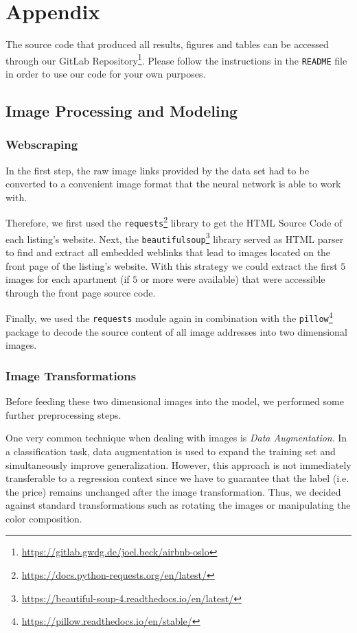 \newpage
\appendix
\section{Appendix}

The source code that produced all results, figures and tables can be accessed through our GitLab Repository\footnote{\url{https://gitlab.gwdg.de/joel.beck/airbnb-oslo}}.
Please follow the instructions in the \texttt{README} file in order to use our code for your own purposes.

\subsection{Image Processing and Modeling} \label{appendix:images}

\subsubsection{Webscraping}

In the first step, the raw image links provided by the data set had to be converted to a convenient image format that the neural network is able to work with.

Therefore, we first used the \texttt{requests}\footnote{\url{https://docs.python-requests.org/en/latest/}} library to get the HTML Source Code of each listing's website.
Next, the \texttt{beautifulsoup}\footnote{\url{https://beautiful-soup-4.readthedocs.io/en/latest/}} library served as HTML parser to find and extract all embedded weblinks that lead to images located on the front page of the listing's website.
With this strategy we could extract the first $5$ images for each apartment (if $5$ or more were available) that were accessible through the front page source code.

Finally, we used the \texttt{requests} module again in combination with the \texttt{pillow}\footnote{\url{https://pillow.readthedocs.io/en/stable/}} package to decode the source content of all image addresses into two dimensional images.

\subsubsection{Image Transformations}

Before feeding these two dimensional images into the model, we performed some further preprocessing steps.

One very common technique when dealing with images is \emph{Data Augmentation}.
In a classification task, data augmentation is used to expand the training set and simultaneously improve generalization. However, this approach is not immediately transferable to a regression context since we have to guarantee that the label (i.e. the price) remains unchanged after the image transformation.
Thus, we decided against standard transformations such as rotating the images or manipulating the color composition.

